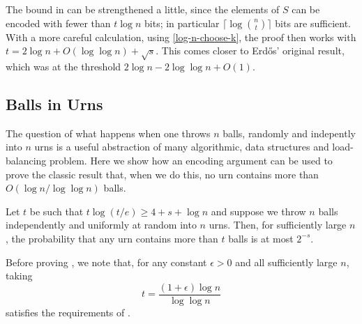 \documentclass{patmorin}
\begin{document}
\begin{rem}
  The bound in  can be strengthened a little,
  since the elements of $S$ can be encoded with fewer than $t\log n$
  bits; in particular $\lceil\log\binom{n}{t}\rceil$ bits are sufficient.
  With a more careful calculation, using \eqref{log-n-choose-k}, the
  proof then works with $t=2\log n +O(\log\log n) + \sqrt{s}$. This
  comes closer to Erdős' original result, which was at the threshold
  $2\log n - 2\log\log n + O(1)$.
\end{rem}



\subsection{Balls in Urns}

The question of what happens when one throws $n$ balls, randomly and
indepently into $n$ urns is a useful abstraction of many algorithmic,
data structures and load-balancing problem.  Here we show how an encoding
argument can be used to prove the classic result that, when we do this,
no urn contains more than $O(\log n/\log\log n)$ balls.

\begin{thm}
  Let $t$ be such that $t\log(t/e) \ge 4+s+\log n$ and suppose we throw
  $n$ balls independently and uniformly at random into $n$ urns. Then,
  for sufficiently large $n$, the probability that any urn contains more 
  than $t$ balls is at most $2^{-s}$.
\end{thm}

Before proving , we note that, for any constant $\epsilon
>0$ and all sufficiently large $n$, taking
\[
   t = \frac{(1+\epsilon)\log n}{\log\log n}
\] 
satisfies the requirements of .
\end{document}
